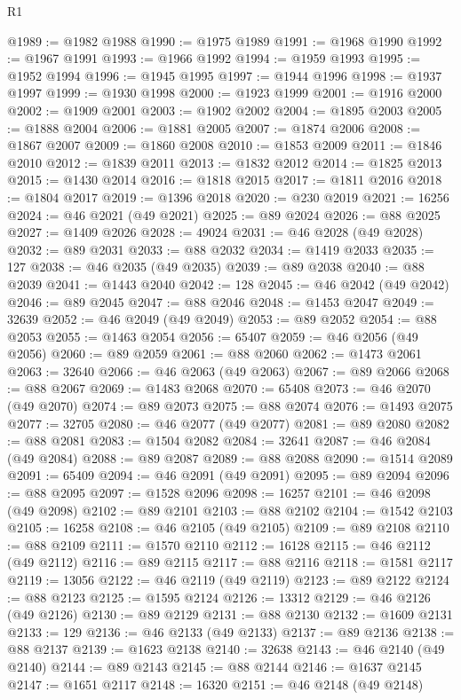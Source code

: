 \begin{lexlean}{R1}
\begin{coremodule}
@1989 := @1982 @1988
@1990 := @1975 @1989
@1991 := @1968 @1990
@1992 := @1967 @1991
@1993 := @1966 @1992
@1994 := @1959 @1993
@1995 := @1952 @1994
@1996 := @1945 @1995
@1997 := @1944 @1996
@1998 := @1937 @1997
@1999 := @1930 @1998
@2000 := @1923 @1999
@2001 := @1916 @2000
@2002 := @1909 @2001
@2003 := @1902 @2002
@2004 := @1895 @2003
@2005 := @1888 @2004
@2006 := @1881 @2005
@2007 := @1874 @2006
@2008 := @1867 @2007
@2009 := @1860 @2008
@2010 := @1853 @2009
@2011 := @1846 @2010
@2012 := @1839 @2011
@2013 := @1832 @2012
@2014 := @1825 @2013
@2015 := @1430 @2014
@2016 := @1818 @2015
@2017 := @1811 @2016
@2018 := @1804 @2017
@2019 := @1396 @2018
@2020 := @230 @2019
@2021 := 16256
@2024 := @46 @2021 (@49 @2021)
@2025 := @89 @2024
@2026 := @88 @2025
@2027 := @1409 @2026
@2028 := 49024
@2031 := @46 @2028 (@49 @2028)
@2032 := @89 @2031
@2033 := @88 @2032
@2034 := @1419 @2033
@2035 := 127
@2038 := @46 @2035 (@49 @2035)
@2039 := @89 @2038
@2040 := @88 @2039
@2041 := @1443 @2040
@2042 := 128
@2045 := @46 @2042 (@49 @2042)
@2046 := @89 @2045
@2047 := @88 @2046
@2048 := @1453 @2047
@2049 := 32639
@2052 := @46 @2049 (@49 @2049)
@2053 := @89 @2052
@2054 := @88 @2053
@2055 := @1463 @2054
@2056 := 65407
@2059 := @46 @2056 (@49 @2056)
@2060 := @89 @2059
@2061 := @88 @2060
@2062 := @1473 @2061
@2063 := 32640
@2066 := @46 @2063 (@49 @2063)
@2067 := @89 @2066
@2068 := @88 @2067
@2069 := @1483 @2068
@2070 := 65408
@2073 := @46 @2070 (@49 @2070)
@2074 := @89 @2073
@2075 := @88 @2074
@2076 := @1493 @2075
@2077 := 32705
@2080 := @46 @2077 (@49 @2077)
@2081 := @89 @2080
@2082 := @88 @2081
@2083 := @1504 @2082
@2084 := 32641
@2087 := @46 @2084 (@49 @2084)
@2088 := @89 @2087
@2089 := @88 @2088
@2090 := @1514 @2089
@2091 := 65409
@2094 := @46 @2091 (@49 @2091)
@2095 := @89 @2094
@2096 := @88 @2095
@2097 := @1528 @2096
@2098 := 16257
@2101 := @46 @2098 (@49 @2098)
@2102 := @89 @2101
@2103 := @88 @2102
@2104 := @1542 @2103
@2105 := 16258
@2108 := @46 @2105 (@49 @2105)
@2109 := @89 @2108
@2110 := @88 @2109
@2111 := @1570 @2110
@2112 := 16128
@2115 := @46 @2112 (@49 @2112)
@2116 := @89 @2115
@2117 := @88 @2116
@2118 := @1581 @2117
@2119 := 13056
@2122 := @46 @2119 (@49 @2119)
@2123 := @89 @2122
@2124 := @88 @2123
@2125 := @1595 @2124
@2126 := 13312
@2129 := @46 @2126 (@49 @2126)
@2130 := @89 @2129
@2131 := @88 @2130
@2132 := @1609 @2131
@2133 := 129
@2136 := @46 @2133 (@49 @2133)
@2137 := @89 @2136
@2138 := @88 @2137
@2139 := @1623 @2138
@2140 := 32638
@2143 := @46 @2140 (@49 @2140)
@2144 := @89 @2143
@2145 := @88 @2144
@2146 := @1637 @2145
@2147 := @1651 @2117
@2148 := 16320
@2151 := @46 @2148 (@49 @2148)

\end{coremodule}
\end{lexlean}
